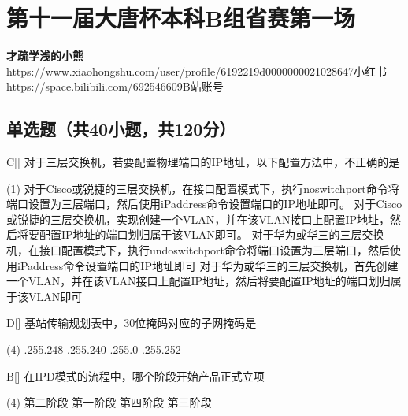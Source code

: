 \chapter{第十一届大唐杯本科B组省赛第一场}
\fancyhead[R]{\color{H6}\kaishu\rightmark\,}

\date{2024年4月20日}{}{\href{https://github.com/xubenshan/dtcup}{\textbf{才疏学浅的小熊}}}
{}
{https://www.xiaohongshu.com/user/profile/6192219d0000000021028647}{小红书}
{https://space.bilibili.com/692546609}{B站账号}




\section{单选题（共40小题，共120分）}



\begin{choice}{C}[]
    对于三层交换机，若要配置物理端口的IP地址，以下配置方法中，不正确的是
    \begin{tasks}(1)
        \task 对于Cisco或锐捷的三层交换机，在接口配置模式下，执行noswitchport命令将端口设置为三层端口，然后使用iPaddress命令设置端口的IP地址即可。
        \task 对于Cisco或锐捷的三层交换机，实现创建一个VLAN，并在该VLAN接口上配置IP地址，然后将要配置IP地址的端口划归属于该VLAN即可。
        \task 对于华为或华三的三层交换机，在接口配置模式下，执行undoswitchport命令将端口设置为三层端口，然后使用iPaddress命令设置端口的IP地址即可
        \task 对于华为或华三的三层交换机，首先创建一个VLAN，并在该VLAN接口上配置IP地址，然后将要配置IP地址的端口划归属于该VLAN即可
    \end{tasks}
\end{choice}


\begin{choice}{D}[]
    基站传输规划表中，30位掩码对应的子网掩码是
    \begin{tasks}(4)
        .255.248
        .255.240
        .255.0
        .255.252
    \end{tasks}
\end{choice}




\begin{choice}{B}[]
    在IPD模式的流程中，哪个阶段开始产品正式立项
    \begin{tasks}(4)
        \task 第二阶段
        \task 第一阶段
        \task 第四阶段
        \task 第三阶段
    \end{tasks}
\end{choice}



